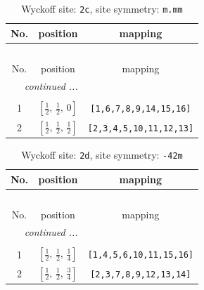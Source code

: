 \documentclass[fleqn,8pt]{jsarticle}
\begin{document}
\renewcommand{\arraystretch}{1.2}
\begin{longtable}{ccc}
\caption{Wyckoff site: {\tt 2c}, site symmetry: {\tt m.mm}}
 \\
 \hline \hline
No. & position & mapping \\ \hline \endfirsthead

\multicolumn{2}{l}{\tablename\ \thetable{}} \\
 \hline \hline
No. & position & mapping \\ \hline \endhead

 \hline \hline
\multicolumn{2}{r}{\footnotesize\it continued ...} \\ \endfoot

 \hline \hline
\multicolumn{2}{r}{} \\ \endlastfoot

1 & $\left[ \frac{1}{2},\, \frac{1}{2},\, 0 \right]$ & {\tt [1,6,7,8,9,14,15,16]} \\ \hline
2 & $\left[ \frac{1}{2},\, \frac{1}{2},\, \frac{1}{2} \right]$ & {\tt [2,3,4,5,10,11,12,13]} \\
\end{longtable}
\renewcommand{\arraystretch}{1.2}
\begin{longtable}{ccc}
\caption{Wyckoff site: {\tt 2d}, site symmetry: {\tt -42m}}
 \\
 \hline \hline
No. & position & mapping \\ \hline \endfirsthead

\multicolumn{2}{l}{\tablename\ \thetable{}} \\
 \hline \hline
No. & position & mapping \\ \hline \endhead

 \hline \hline
\multicolumn{2}{r}{\footnotesize\it continued ...} \\ \endfoot

 \hline \hline
\multicolumn{2}{r}{} \\ \endlastfoot

1 & $\left[ \frac{1}{2},\, \frac{1}{2},\, \frac{1}{4} \right]$ & {\tt [1,4,5,6,10,11,15,16]} \\ \hline
2 & $\left[ \frac{1}{2},\, \frac{1}{2},\, \frac{3}{4} \right]$ & {\tt [2,3,7,8,9,12,13,14]} \\
\end{longtable}
\renewcommand{\arraystretch}{1.2}
\end{document}
